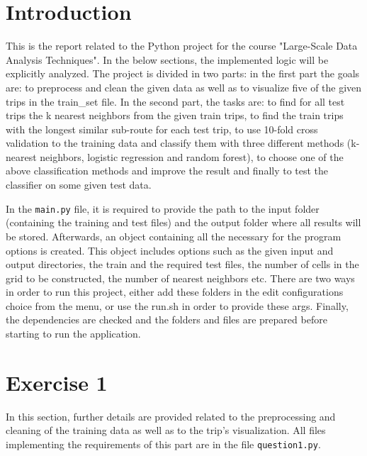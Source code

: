 \documentclass[12pt]{article}
\begin{document}
	\section{Introduction}
    This is the report related to the Python project for the course "Large-Scale Data Analysis Techniques". In the below sections, the implemented logic will be explicitly analyzed. The project is divided in two parts: in the first part the goals are: to preprocess and clean the given data as well as to visualize five of the given trips in the train\_set file. In the second part, the tasks are: to find for all test trips the k nearest neighbors from the given train trips, to find the train trips with the longest similar sub-route for each test trip, to use 10-fold cross validation to the training data and classify them with three different methods (k-nearest neighbors, logistic regression and random forest), to choose one of the above classification methods and improve the result and finally to test the classifier on some given test data.
    
    In the \texttt{main.py} file, it is required to provide the path to the input folder (containing the training and test files) and the output folder where all results will be stored. Afterwards, an object containing all the necessary for the program options is created. This object includes options such as the given input and output directories, the train and the required test files, the number of cells in the grid to be constructed, the number of nearest neighbors etc. There are two ways in order to run this project, either add these folders in the edit configurations choice from the menu, or use the run.sh in order to provide these args. Finally, the dependencies are checked and the folders and files are prepared before starting to run the application.
    
	\section{Exercise 1}
	In this section, further details are provided related to the preprocessing and cleaning of the training data as well as to the trip's visualization. All files implementing the requirements of this part are in the file \texttt{question1.py}.
	
\end{document}
